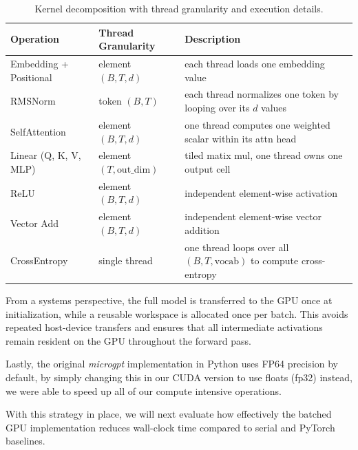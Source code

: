 \begin{table}[h]
\centering
\begin{tabular}{l l l}
\toprule
\textbf{Operation} & \textbf{Thread Granularity} & \textbf{Description} \\
\midrule
Embedding + Positional & element $(B,T,d)$ & each thread loads one embedding value \\
RMSNorm & token $(B, T)$ & each thread normalizes one token by looping over its $d$ values  \\
SelfAttention & element $(B,T,d)$ & one thread computes one weighted scalar within its attn head \\
Linear (Q, K, V, MLP) & element $(T,\text{out\_dim})$ & tiled matix mul, one thread owns one output cell \\
ReLU & element $(B,T,d)$ & independent element-wise activation \\
Vector Add & element $(B,T,d)$ & independent element-wise vector addition \\
CrossEntropy & single thread & one thread loops over all $(B,T,\text{vocab})$ to compute cross-entropy \\
\bottomrule
\end{tabular}
\caption{Kernel decomposition with thread granularity and execution details.}
\label{tab:kernels}
\end{table}

From a systems perspective, the full model is transferred to the GPU once at initialization, while a reusable workspace is allocated once per batch. This avoids repeated host-device transfers and ensures that all intermediate activations remain resident on the GPU throughout the forward pass.

Lastly, the original \textit{microgpt} implementation in Python uses FP64 precision by default, by simply changing this in our CUDA version to use floats (fp32) instead, we were able to speed up all of our compute intensive operations.

With this strategy in place, we will next evaluate how effectively the batched GPU implementation reduces wall-clock time compared to serial and PyTorch baselines. 